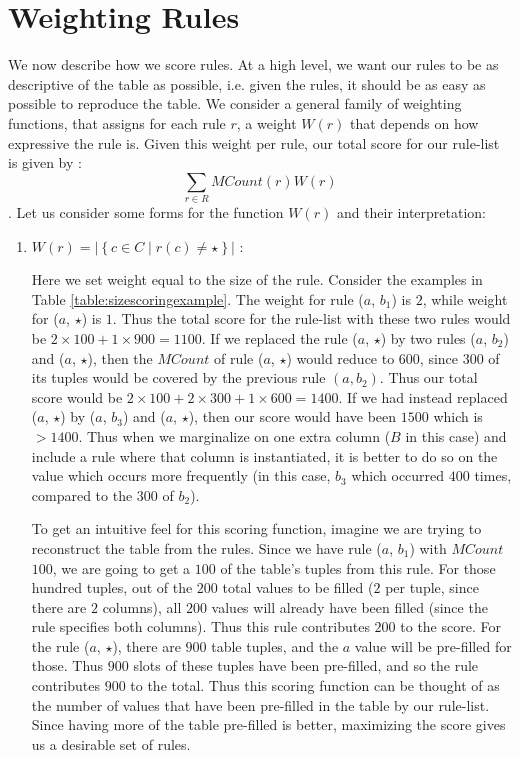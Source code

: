 \documentclass{sig-alternate}
\begin{document}
\section{Weighting Rules}
\label{sec:weighting}
We now describe how we score rules. At a high level, we want our rules to be as descriptive of the table as possible, i.e. given the rules, it should be as easy as possible to reproduce the table. We consider a general family of weighting functions, that assigns for each rule $r$, a weight $W(r)$ that depends on how expressive the rule is. Given this weight per rule, our total score for our rule-list is given by : $$\sum_{r\in R} MCount(r)W(r)$$. Let us consider some forms for the function $W(r)$ and their interpretation:
\begin{enumerate}
\item $W(r) = |\left\lbrace c \in C \mid r(c) \neq \star \right\rbrace |$ : 

Here we set weight equal to the size of the rule. Consider the examples in Table \ref{table:sizescoringexample}. The weight for rule ($a$, $b_1$) is $2$, while weight for ($a$, $\star$) is $1$. Thus the total score for the rule-list with these two rules would be $2 \times 100 + 1 \times 900 = 1100$. If we replaced the rule ($a$, $\star$) by two rules ($a$, $b_2$) and ($a$, $\star$), then the $MCount$ of rule ($a$, $\star$) would reduce to $600$, since $300$ of its tuples would be covered by the previous rule $(a, b_2)$. Thus our total score would be $2 \times 100 + 2 \times 300 + 1 \times 600 = 1400$. If we had instead replaced ($a$, $\star$) by ($a$, $b_3$) and ($a$, $\star$), then our score would have been $1500$ which is $> 1400$. Thus when we marginalize on one extra column ($B$ in this case) and include a rule where that column is instantiated, it is better to do so on the value which occurs more frequently (in this case, $b_3$ which occurred $400$ times, compared to the $300$ of $b_2$). 

To get an intuitive feel for this scoring function, imagine we are trying to reconstruct the table from the rules. Since we have rule ($a$, $b_1$) with $MCount$ $100$, we are going to get a $100$ of the table's tuples from this rule. For those hundred tuples, out of the $200$ total values to be filled ($2$ per tuple, since there are $2$ columns), all $200$ values will already have been filled (since the rule specifies both columns). Thus this rule contributes $200$ to the score. For the rule ($a$, $\star$), there are $900$ table tuples, and the $a$ value will be pre-filled for those. Thus $900$ slots of these tuples have been pre-filled, and so the rule contributes $900$ to the total. Thus this scoring function can be thought of as the number of values that have been pre-filled in the table by our rule-list. Since having more of the table pre-filled is better, maximizing the score gives us a desirable set of rules.


\end{enumerate}
\end{document}
